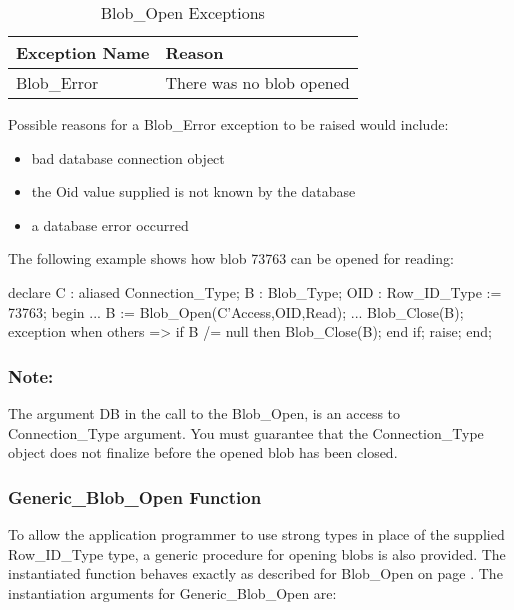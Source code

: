 \documentclass[english,letterpaper]{book}
\begin{document}
\begin{table}
   \begin{center}
      \begin{tabular}{ll}
         Exception Name    &  Reason\\
         \hline 
         Blob\_Error       &  There was no blob opened\\
      \end{tabular}
   \end{center}
   \caption{Blob\_Open Exceptions}\label{t:bopnx}
\end{table}

Possible reasons for a Blob\_Error exception to be raised would include:

\begin{itemize}
   \item bad database connection object
   \item the Oid value supplied is not known by the database
   \item a database error occurred
\end{itemize}

The following example shows how blob 73763 can be opened for reading:

\label{Example-code-with-OID-73763}
\begin{Example}
declare
   C :   aliased Connection_Type;
   B :   Blob_Type;
   OID : Row_ID_Type := 73763;
begin
   ...
   B := Blob_Open(C'Access,OID,Read);
   ...
   Blob_Close(B);
exception
   when others =>
      if B /= null then
         Blob_Close(B);
      end if;
      raise;
end;
\end{Example}

\subsubsection{Note:}

The argument DB in the call to the Blob\_Open, is an access
to Connection\_Type argument. You must guarantee that the Connection\_Type
object does not finalize before the opened blob has been closed.


\subsubsection{Generic\_Blob\_Open Function}

To allow the application programmer to use strong types in place of
the supplied Row\_ID\_Type type, a generic procedure for opening blobs
is also provided. The instantiated function behaves exactly as described
for Blob\_Open on page \pageref{Blob_Open Function}. The instantiation
arguments for Generic\_Blob\_Open are:
\end{document}
